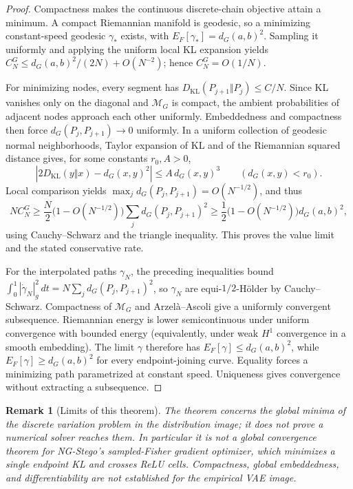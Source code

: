 \documentclass[10pt,a4paper]{article}
\newtheorem{remark}{Remark}
\newcommand{\KL}{D_{\mathrm{KL}}}
\newcommand{\MM}{\mathcal M_G}
\begin{document}
\begin{proof}
Compactness makes the continuous discrete-chain objective attain a minimum. A compact Riemannian manifold is geodesic, so a minimizing constant-speed geodesic $\gamma_*$ exists, with $E_F[\gamma_*]=d_G(a,b)^2$. Sampling it uniformly and applying the uniform local KL expansion yields
$C_N^G\le d_G(a,b)^2/(2N)+O(N^{-2})$; hence $C_N^G=O(1/N)$.

For minimizing nodes, every segment has $\KL(P_{j+1}\Vert P_j)\le C/N$. Since KL vanishes only on the diagonal and $\MM$ is compact, the ambient probabilities of adjacent nodes approach each other uniformly. Embeddedness and compactness then force $d_G(P_j,P_{j+1})\to0$ uniformly. In a uniform collection of geodesic normal neighborhoods, Taylor expansion of KL and of the Riemannian squared distance gives, for some constants $r_0,A>0$,
\[
\left|2\KL(y\Vert x)-d_G(x,y)^2\right|\le A\,d_G(x,y)^3
\qquad(d_G(x,y)<r_0).
\]
Local comparison yields $\max_j d_G(P_j,P_{j+1})=O(N^{-1/2})$, and thus
\[
N C_N^G\ge \frac{N}{2}\Big(1-O(N^{-1/2})\Big)\sum_jd_G(P_j,P_{j+1})^2
\ge\frac12\Big(1-O(N^{-1/2})\Big)d_G(a,b)^2,
\]
using Cauchy--Schwarz and the triangle inequality. This proves the value limit and the stated conservative rate.

For the interpolated paths $\gamma_N$, the preceding inequalities bound $\int_0^1|\dot\gamma_N|_g^2\,dt=N\sum_jd_G(P_j,P_{j+1})^2$, so $\gamma_N$ are equi-$1/2$-H\"older by Cauchy--Schwarz. Compactness of $\MM$ and Arzel\`a--Ascoli give a uniformly convergent subsequence. Riemannian energy is lower semicontinuous under uniform convergence with bounded energy (equivalently, under weak $H^1$ convergence in a smooth embedding). The limit $\gamma$ therefore has $E_F[\gamma]\le d_G(a,b)^2$, while $E_F[\gamma]\ge d_G(a,b)^2$ for every endpoint-joining curve. Equality forces a minimizing path parametrized at constant speed. Uniqueness gives convergence without extracting a subsequence.
\end{proof}
\begin{remark}[Limits of this theorem]
The theorem concerns the \emph{global} minima of the discrete variation problem in the \emph{distribution image}; it does not prove a numerical solver reaches them. In particular it is not a global convergence theorem for NG-Stego's sampled-Fisher gradient optimizer, which minimizes a \emph{single endpoint KL} and crosses ReLU cells. Compactness, global embeddedness, and differentiability are not established for the empirical VAE image.
\end{remark}
\end{document}
